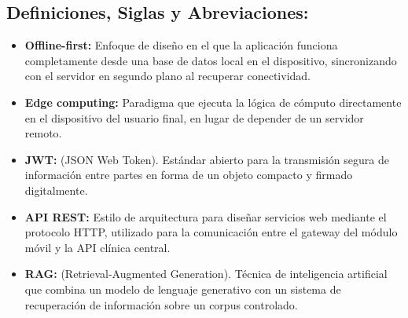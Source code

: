 \subsection*{Definiciones, Siglas y Abreviaciones:}
\begin{itemize}
    \item \textbf{Offline-first:} Enfoque de diseño en el que la aplicación funciona completamente desde una base de datos local en el dispositivo, sincronizando con el servidor en segundo plano al recuperar conectividad.
    \item \textbf{Edge computing:} Paradigma que ejecuta la lógica de cómputo directamente en el dispositivo del usuario final, en lugar de depender de un servidor remoto.
    \item \textbf{JWT:} (JSON Web Token). Estándar abierto para la transmisión segura de información entre partes en forma de un objeto compacto y firmado digitalmente.
    \item \textbf{API REST:} Estilo de arquitectura para diseñar servicios web mediante el protocolo HTTP, utilizado para la comunicación entre el gateway del módulo móvil y la API clínica central.
    \item \textbf{RAG:} (Retrieval-Augmented Generation). Técnica de inteligencia artificial que combina un modelo de lenguaje generativo con un sistema de recuperación de información sobre un corpus controlado.
\end{itemize}